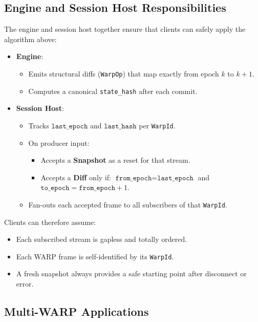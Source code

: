 \subsection{Engine and Session Host Responsibilities}

The engine and session host together ensure that clients can safely apply the
algorithm above:

\begin{itemize}
  \item \textbf{Engine}:
    \begin{itemize}
      \item Emits structural diffs (\texttt{WarpOp}) that map exactly from
            epoch \(k\) to \(k+1\).
      \item Computes a canonical \texttt{state\_hash} after each commit.
    \end{itemize}
  \item \textbf{Session Host}:
    \begin{itemize}
      \item Tracks \(\texttt{last\_epoch}\) and \(\texttt{last\_hash}\) per
            \texttt{WarpId}.
      \item On producer input:
        \begin{itemize}
          \item Accepts a \textbf{Snapshot} as a reset for that stream.
          \item Accepts a \textbf{Diff} only if:
            \(\texttt{from\_epoch} = \texttt{last\_epoch}\) and
            \(\texttt{to\_epoch} = \texttt{from\_epoch} + 1\).
        \end{itemize}
      \item Fan-outs each accepted frame to all subscribers of that
            \texttt{WarpId}.
    \end{itemize}
\end{itemize}

Clients can therefore assume:

\begin{itemize}
  \item Each subscribed stream is gapless and totally ordered.
  \item Each WARP frame is self-identified by its \texttt{WarpId}.
  \item A fresh snapshot always provides a safe starting point after
        disconnect or error.
\end{itemize}

\subsection{Multi-WARP Applications}

